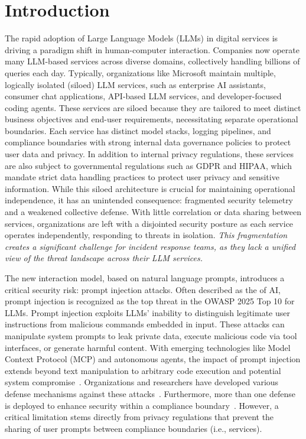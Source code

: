 
\section{Introduction}
\label{sec:introduction}


The rapid adoption of Large Language Models (LLMs) in digital services is driving a paradigm shift in human-computer interaction.
Companies now operate many LLM-based services across diverse domains, collectively handling billions of queries each day.
Typically, organizations like Microsoft maintain multiple, logically isolated (siloed) LLM services, such as enterprise AI assistants, consumer chat applications, API-based LLM services, and developer-focused coding agents.
These services are siloed because they are tailored to meet distinct business objectives and end-user requirements, necessitating separate operational boundaries.
Each service has distinct model stacks, logging pipelines, and compliance boundaries with strong internal data governance policies to protect user data and privacy. In addition to internal privacy regulations, these services are also subject to governmental regulations such as GDPR and HIPAA, which mandate strict data handling practices to protect user privacy and sensitive information.
%
While this siloed architecture is crucial for maintaining operational independence, it has an unintended consequence: fragmented security telemetry and a weakened collective defense.
With little correlation or data sharing between services, organizations are left with a disjointed security posture as each service operates independently, responding to threats in isolation. \emph{This fragmentation creates a significant challenge for incident response teams, as they lack a unified view of the threat landscape across their LLM services.}

 The new interaction model, based on natural language prompts, introduces a critical security risk: prompt injection attacks.
Often described as the  of AI, prompt injection is recognized as the top threat in the OWASP 2025 Top 10 for LLMs. Prompt injection exploits LLMs’ inability to distinguish legitimate user instructions from malicious commands embedded in input. These attacks can manipulate system prompts to leak private data, execute malicious code via tool interfaces, or generate harmful content. With emerging technologies like Model Context Protocol (MCP) and  autonomous agents, the impact of prompt injection extends beyond text manipulation to arbitrary code execution and potential system compromise~\cite{thehackernewsZeroClickVulnerability}.
%
Organizations and researchers have developed various defense mechanisms against these attacks~\cite{abdelnabi2025get, abdelnabi2025llmail}.
Furthermore, more than one defense is deployed to enhance security within a compliance boundary~\cite{abdelnabi2025llmail}.
However, a critical limitation stems directly from privacy regulations that prevent the sharing of user prompts between compliance boundaries (i.e., services). 

